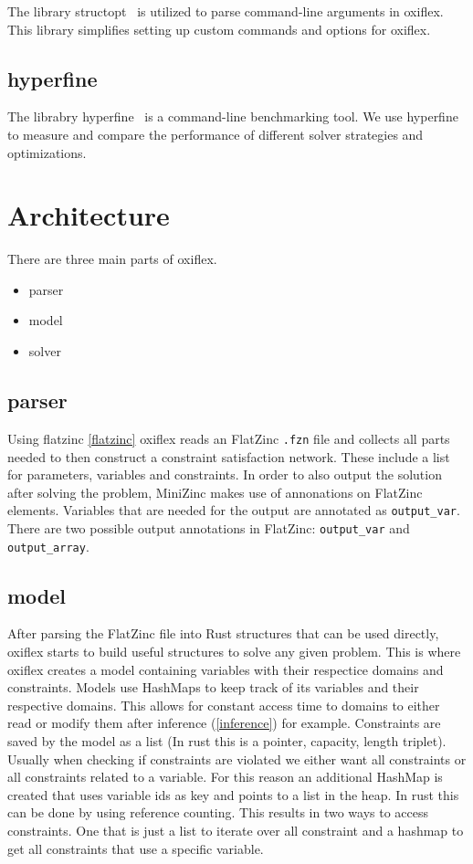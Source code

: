 The library structopt~\cite{structopt:2020} is utilized to parse command-line arguments in oxiflex. This library simplifies setting up custom commands and options for oxiflex.

\subsection{hyperfine}

The librabry hyperfine~\cite{hyperfine:2023} is a command-line benchmarking tool. We use hyperfine to measure and compare the performance of different solver strategies and optimizations.

\section{Architecture}

There are three main parts of oxiflex.

\begin{itemize}
	\item parser
	\item model
	\item solver
\end{itemize}

\subsection{parser}

Using flatzinc \ref{flatzinc} oxiflex reads an FlatZinc \verb|.fzn| file and collects all parts needed to then construct a constraint satisfaction network. These include a list for parameters, variables and constraints. In order to also output the solution after solving the problem, MiniZinc makes use of annonations on FlatZinc elements. Variables that are needed for the output are annotated as \verb|output_var|. There are two possible output annotations in FlatZinc: \verb|output_var| and \verb|output_array|.

\subsection{model}

After parsing the FlatZinc file into Rust structures that can be used directly, oxiflex starts to build useful structures  to solve any given problem. This is where oxiflex creates a model containing variables with their respectice domains and constraints. Models use HashMaps to keep track of its variables and their respective domains. This allows for constant access time to domains to either read or modify them after inference (\ref{inference}) for example. Constraints are saved by the model as a list (In rust this is a pointer, capacity, length triplet). Usually when checking if constraints are violated we either want all constraints or all constraints related to a variable. For this reason an additional HashMap is created that uses variable ids as key and points to a list in the heap. In rust this can be done by using reference counting. This results in two ways to access constraints. One that is just a list to iterate over all constraint and a hashmap to get all constraints that use a specific variable.

